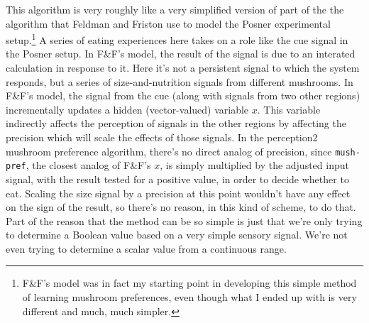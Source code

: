 \documentclass[12pt]{article}
\newcommand{\fn}[1]{\footnote{#1}}
\begin{document}
This algorithm is very roughly like a very simplified version of part of
the the algorithm that Feldman and Friston \citeyearpar[p.\
9]{FeldmanFriston:AttentionUncertainty} use to model the Posner
experimental setup.\fn{
    F\&F's model was in fact my starting point in developing this simple
    method of learning mushroom preferences, even though what I ended up
    with is very different and much, much simpler.}
A series of eating experiences here takes on a role like the cue signal
in the Posner setup.  In F\&F's model, the result of the signal is due
to an interated calculation in response to it.  Here it's not a
persistent signal to which the system responds, but a series of
size-and-nutrition signals from different mushrooms. In F\&F's model,
the signal from the cue (along with signals from two other regions)
incrementally updates a hidden (vector-valued) variable $x$.  This
variable indirectly affects the perception of signals in the other regions by
affecting the precision which will scale the effects of those signals.  In
the perception2 mushroom preference algorithm, there's no direct analog
of precision, since {\tt mush-pref}, the closest analog of F\&F's $x$, is simply
multiplied by the adjusted input signal, with the result tested for a 
positive value, in order to decide whether to eat.  Scaling the size signal by
a precision at this point wouldn't have any effect on the sign of the result, so
there's no reason, in this kind of scheme, to do that.  Part of the reason
that the method can be so simple is just that we're only trying to determine
a Boolean value based on a very simple sensory signal.  We're not even trying
to determine a scalar value from a continuous range.



\end{document}
